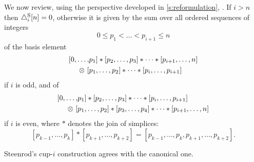 We now review, using the perspective developed in \cref{s:reformulation},  \cite[p.293]{steenrod1947products}.
If $i > n$ then $\triangle_i^{\mathrm{S}} [n] = 0$, otherwise it is given by the sum over all ordered sequences of integers
\[
0 \leq p_1 < \dots < p_{i+1} \leq n
\]
of the basis element
\begin{equation}\label{e:original i odd}
\begin{split}
[ 0, \dots, &{p_1} ] \ast [ {p_2}, \dots, {p_3} ] \ast \dots \ast [ {p_{i+1}}, \dots, n ] \\
\otimes \ [ &{p_1}, \dots, {p_2} ] \ast \dots \ast [ {p_{i}}, \dots, {p_{i+1}} ]
\end{split}
\end{equation}
if $i$ is odd, and of
\begin{equation}\label{e:original i even}
\begin{split}
[ 0, \dots, &{p_1} ] \ast [ {p_2}, \dots, {p_3} ] \ast \dots \ast [ {p_{i}}, \dots, {p_{i+1}} ] \\
\otimes \ [ &{p_1}, \dots, {p_2} ] \ast [ {p_3}, \dots, {p_4} ] \ast \dots \ast [ {p_{i+1}}, \dots, n ]
\end{split}
\end{equation}
if $i$ is even, where $\ast$ denotes the join of simplices:
\[
[{p_{k-1}}, \dots, {p_{k}} ] \ast [ {p_{k+1}}, \dots, p_{k+2}] = [{p_{k-1}}, \dots, p_k, p_{k+1}, \dots, p_{k+2}].
\]

\begin{theorem*}\label{t:steenrod cup-i}
	Steenrod's \mbox{cup-$i$} construction agrees with the canonical one.
\end{theorem*}

